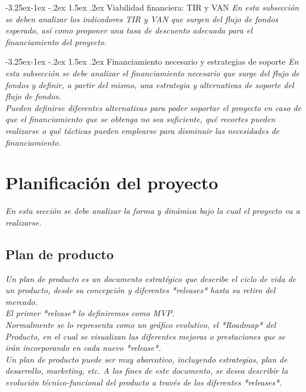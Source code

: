\documentclass[12pt]{article}
\makeatletter
\renewcommand\paragraph{\@startsection{paragraph}{4}{\z@}%
                                     {-3.25ex\@plus -1ex \@minus -.2ex}%
                                     {1.5ex \@plus .2ex}%
                                     {\normalfont\normalsize\bfseries}}
\makeatother
\begin{document}
    \paragraph{Viabilidad financiera: TIR y VAN}
    {\it
    En esta subsección se deben analizar los indicadores TIR y VAN que surgen del flujo de fondos esperado, así como proponer una tasa de descuento adecuada para el financiamiento del proyecto.
    }

    \paragraph{Financiamiento necesario y estrategias de soporte}
    {\it
    En esta subsección se debe analizar el financiamiento necesario que surge del flujo de fondos y definir, a partir del mismo, una estrategia y alternativas de soporte del flujo de fondos.\\
    Pueden definirse diferentes alternativas para poder soportar el proyecto en caso de que el financiamiento que se obtenga no sea suficiente, qué recortes pueden realizarse o qué tácticas pueden emplearse para disminuir las necesidades de financiamiento.
    }


\section{Planificación del proyecto}
{\it
En esta sección se debe analizar la forma y dinámica bajo la cual el proyecto va a realizarse.
}

\subsection{Plan de producto}
{\it
Un plan de producto es un documento estratégico que describe el ciclo de vida de un producto, desde su concepción y diferentes *releases* hasta su retiro del mercado.\\
El primer *release* lo definiremos como MVP.\\
Normalmente se lo representa como un gráfico evolutivo, el *Roadmap* del Producto, en el cual se visualizan las diferentes mejoras o prestaciones que se irán incorporando en cada nuevo *release*.\\
Un plan de producto puede ser muy abarcativo, incluyendo estrategias, plan de desarrollo, marketing, etc. A los fines de este documento, se desea describir la evolución técnico-funcional del producto a través de los diferentes *releases*.
}
\end{document}
